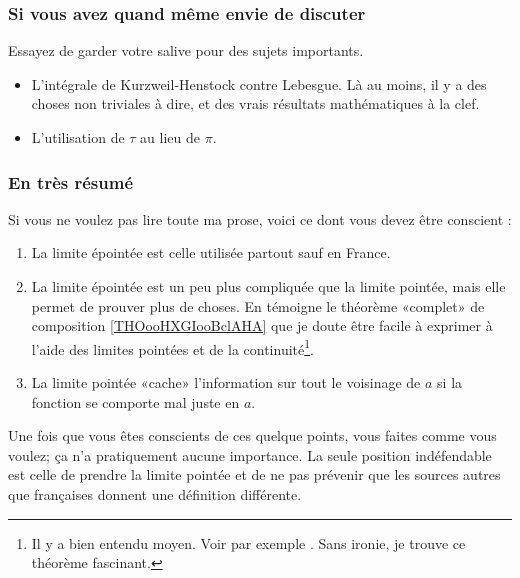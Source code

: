 \subsubsection{Si vous avez quand même envie de discuter}

Essayez de garder votre salive pour des sujets importants.
\begin{itemize}
    \item 
L'intégrale de Kurzweil-Henstock\cite{BIBooLGJXooZhEXJf} contre Lebesgue. Là au moins, il y a des choses non triviales à dire, et des vrais résultats mathématiques à la clef.
\item
    L'utilisation de \( \tau\) au lieu de \( \pi\).
\end{itemize}


\subsubsection{En très résumé}

Si vous ne voulez pas lire toute ma prose, voici ce dont vous devez être conscient :
\begin{enumerate}
	\item
	      La limite épointée est celle utilisée partout sauf en France.
	\item
	      La limite épointée est un peu plus compliquée que la limite pointée, mais elle permet de prouver plus de choses. En témoigne le théorème «complet» de composition \ref{THOooHXGIooBclAHA} que je doute être facile à exprimer à l'aide des limites pointées et de la continuité\footnote{Il y a bien entendu moyen. Voir par exemple \cite{BIBooDAGXooRltbgK}. Sans ironie, je trouve ce théorème fascinant.}.
	\item
	      La limite pointée «cache» l'information sur tout le voisinage de \( a\) si la fonction se comporte mal juste en \( a\).
\end{enumerate}
Une fois que vous êtes conscients de ces quelque points, vous faites comme vous voulez; ça n'a pratiquement aucune importance. La seule position indéfendable est celle de prendre la limite pointée et de ne pas prévenir  que les sources autres que françaises donnent une définition différente.

